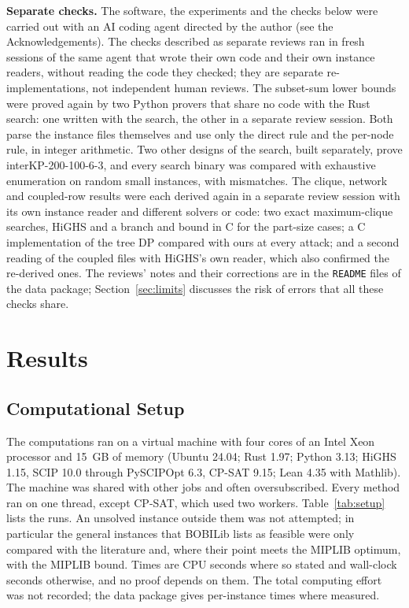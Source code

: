 \documentclass[]{spie}  %
\theoremstyle{plain}
\newcommand{\code}[1]{\texttt{#1}}
\newcommand{\inst}[1]{\mbox{#1}}             %
\begin{document}
\textbf{Separate checks.} The software, the experiments and the checks below were carried out with
an AI coding agent directed by the author (see the Acknowledgements). The checks described as
separate reviews ran in fresh sessions of the same agent that wrote their own code and their own
instance readers, without reading the code they checked; they are separate re-implementations,
not independent human reviews. The \NumNewKip{} subset-sum lower bounds were proved again by two
Python provers that share no code with the Rust search: one written with the search, the other in
a separate review session. Both parse the instance files themselves and use only the direct rule
and the per-node rule, in integer arithmetic. Two other designs of the search, built separately,
prove \inst{interKP-200-100-6-3}, and every search binary was compared with exhaustive
enumeration on \KipBruteForceInstances{} random small instances, with
\KipBruteForceMismatches{} mismatches. The clique, network and coupled-row results were each
derived again in a separate review session with its own instance reader and different solvers or
code: two exact maximum-clique searches, HiGHS and a branch and bound in C for the part-size cases;
a C implementation of the tree DP compared with ours at every attack; and a second reading of the
coupled files with HiGHS's own reader, which also confirmed the re-derived ones. The reviews'
notes and their corrections are in the \code{README} files of the data package;
Section~\ref{sec:limits} discusses the risk of errors that all these checks share.

\section{Results}\label{sec:results}

\subsection{Computational Setup}\label{sec:setup}

The computations ran on a virtual machine with four cores of an Intel Xeon processor and 15~GB
of memory (Ubuntu 24.04; Rust 1.97; Python 3.13; HiGHS 1.15, SCIP 10.0 through
PySCIPOpt 6.3, \mbox{CP-SAT} 9.15; Lean 4.35 with Mathlib). The machine was shared with other jobs and
often oversubscribed. Every method ran on one thread, except \mbox{CP-SAT}, which used two workers.
Table~\ref{tab:setup} lists the runs. An unsolved instance outside them was not attempted; in
particular the general instances that BOBILib lists as feasible were only compared with the
literature and, where their point meets the MIPLIB optimum, with the MIPLIB bound. Times are CPU
seconds where so stated and wall-clock seconds otherwise, and no proof depends on them. The total
computing effort was not recorded; the data package gives per-instance times where measured.
\end{document}
